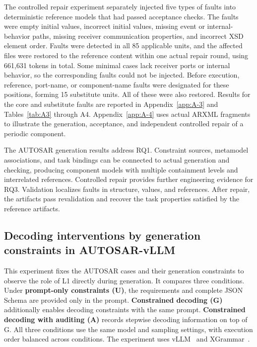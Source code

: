 \documentclass[pdflatex,iicol,sn-mathphys-num]{sn-jnl}
\newcommand{\paperref}[1]{~\citep{#1}}
\begin{document}
The controlled repair experiment separately injected five types of faults into deterministic reference models that had passed acceptance checks. The faults were empty initial values, incorrect initial values, missing event or internal-behavior paths, missing receiver communication properties, and incorrect XSD element order. Faults were detected in all 85 applicable units, and the affected files were restored to the reference content within one actual repair round, using 661,631 tokens in total. Some minimal cases lack receiver ports or internal behavior, so the corresponding faults could not be injected. Before execution, reference, port-name, or component-name faults were designated for these positions, forming 15 substitute units. All of these were also restored. Results for the core and substitute faults are reported in Appendix~\ref{app:A-3} and Tables~\ref{tab:A3} through A4. Appendix~\ref{app:A-4} uses actual ARXML fragments to illustrate the generation, acceptance, and independent controlled repair of a periodic component.


The AUTOSAR generation results address RQ1. Constraint sources, metamodel associations, and task bindings can be connected to actual generation and checking, producing component models with multiple containment levels and interrelated references. Controlled repair provides further engineering evidence for RQ3. Validation localizes faults in structure, values, and references. After repair, the artifacts pass revalidation and recover the task properties satisfied by the reference artifacts.


\subsection{Decoding interventions by generation constraints in AUTOSAR-vLLM}\label{sec:eval-4-3}

This experiment fixes the AUTOSAR cases and their generation constraints to observe the role of L1 directly during generation. It compares three conditions. Under \textbf{prompt-only constraints (U)}, the requirements and complete JSON Schema are provided only in the prompt. \textbf{Constrained decoding (G)} additionally enables decoding constraints with the same prompt. \textbf{Constrained decoding with auditing (A)} records stepwise decoding information on top of G. All three conditions use the same model and sampling settings, with execution order balanced across conditions. The experiment uses vLLM\paperref{Kwon_2023} and XGrammar\paperref{MLSYS2025_5c20ca4b}.
\end{document}
